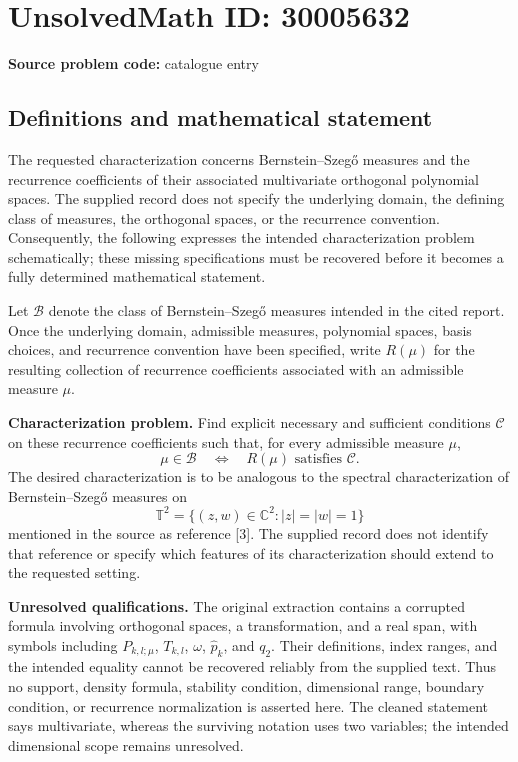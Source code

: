 \documentclass[11pt]{article}
\newcommand{\C}{\mathbb{C}}
\begin{document}
\section*{UnsolvedMath ID: 30005632}
\textbf{Source problem code:} catalogue entry
\subsection{Definitions and mathematical statement}
The requested characterization concerns Bernstein--Szeg\H{o} measures and the recurrence coefficients of their associated multivariate orthogonal polynomial spaces. The supplied record does not specify the underlying domain, the defining class of measures, the orthogonal spaces, or the recurrence convention. Consequently, the following expresses the intended characterization problem schematically; these missing specifications must be recovered before it becomes a fully determined mathematical statement.

Let \(\mathcal B\) denote the class of Bernstein--Szeg\H{o} measures intended in the cited report. Once the underlying domain, admissible measures, polynomial spaces, basis choices, and recurrence convention have been specified, write \(R(\mu)\) for the resulting collection of recurrence coefficients associated with an admissible measure \(\mu\).

\textbf{Characterization problem.} Find explicit necessary and sufficient conditions \(\mathcal C\) on these recurrence coefficients such that, for every admissible measure \(\mu\),
\[
\mu\in\mathcal B
\quad\Longleftrightarrow\quad
R(\mu)\text{ satisfies }\mathcal C.
\]
The desired characterization is to be analogous to the spectral characterization of Bernstein--Szeg\H{o} measures on
\[
\mathbb T^2=\{(z,w)\in\C^2:|z|=|w|=1\}
\]
mentioned in the source as reference [3]. The supplied record does not identify that reference or specify which features of its characterization should extend to the requested setting.

\textbf{Unresolved qualifications.} The original extraction contains a corrupted formula involving orthogonal spaces, a transformation, and a real span, with symbols including \(P_{k,l;\mu}\), \(T_{k,l}\), \(\omega\), \(\widehat p_k\), and \(q_2\). Their definitions, index ranges, and the intended equality cannot be recovered reliably from the supplied text. Thus no support, density formula, stability condition, dimensional range, boundary condition, or recurrence normalization is asserted here. The cleaned statement says multivariate, whereas the surviving notation uses two variables; the intended dimensional scope remains unresolved.
\end{document}
